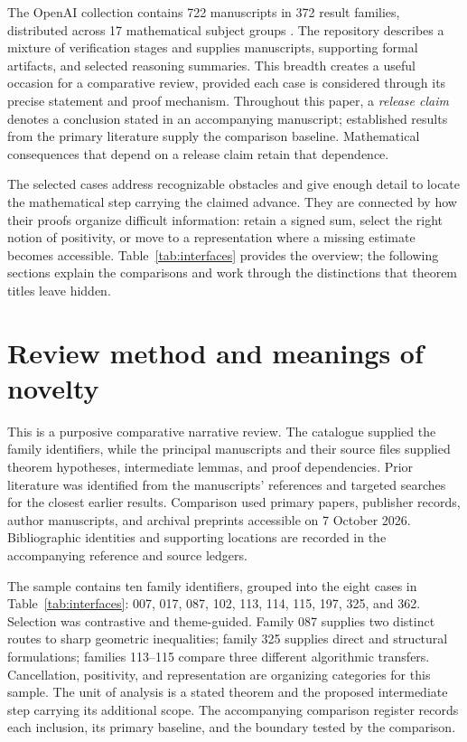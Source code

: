 \documentclass[11pt]{article}
\begin{document}
The OpenAI collection contains 722 manuscripts in 372 result families,
distributed across 17 mathematical subject groups \citep{OpenAIRelease}.
The repository describes a mixture of verification stages and supplies
manuscripts, supporting formal artifacts, and selected reasoning summaries.
This breadth creates a useful occasion for a comparative review, provided
each case is considered through its precise statement and proof mechanism.
Throughout this paper, a \emph{release claim} denotes a conclusion stated
in an accompanying manuscript; established results from the primary
literature supply the comparison baseline. Mathematical consequences that
depend on a release claim retain that dependence.

The selected cases address recognizable obstacles and give enough detail
to locate the mathematical step carrying the claimed advance. They are
connected by how their proofs organize difficult information: retain a
signed sum, select the right notion of positivity, or move to a
representation where a missing estimate becomes accessible. Table~\ref{tab:interfaces}
provides the overview; the following sections explain the comparisons
and work through the distinctions that theorem titles leave hidden.



\section{Review method and meanings of novelty}\label{sec:method}
This is a purposive comparative narrative review. The catalogue supplied
the family identifiers, while the principal manuscripts and their source
files supplied theorem hypotheses, intermediate lemmas, and proof
dependencies. Prior literature was identified from the manuscripts'
references and targeted searches for the closest earlier results.
Comparison used primary papers, publisher records, author manuscripts,
and archival preprints accessible on 7 October 2026. Bibliographic
identities and supporting locations are recorded in the accompanying
reference and source ledgers.

The sample contains ten family identifiers, grouped into the eight cases
in Table~\ref{tab:interfaces}: 007, 017, 087, 102, 113, 114, 115, 197,
325, and 362. Selection was contrastive and theme-guided. Family 087
supplies two distinct routes to sharp geometric inequalities; family 325
supplies direct and structural formulations; families 113--115 compare
three different algorithmic transfers. Cancellation, positivity, and
representation are organizing categories for this sample. The unit of
analysis is a stated theorem and the proposed intermediate step carrying
its additional scope. The accompanying comparison register records each
inclusion, its primary baseline, and the boundary tested by the comparison.
\end{document}
